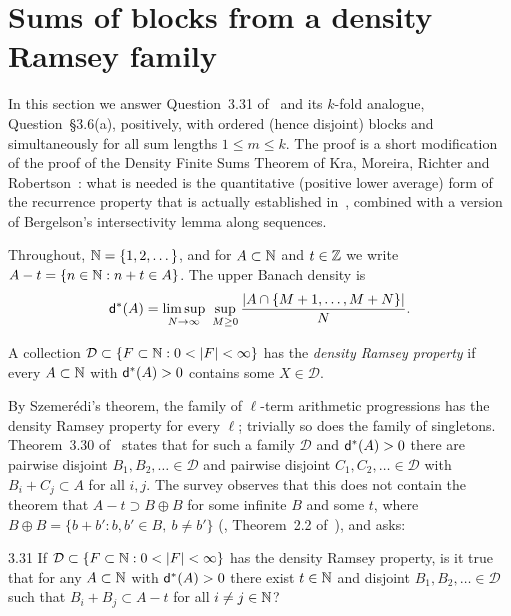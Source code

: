 
\section{Sums of blocks from a density Ramsey family}
\label{IB:sec:q331}

In this section we answer Question~3.31 of~\cite{kra2023problems} and its
$k$-fold analogue, Question~\S3.6(a), positively, with ordered (hence disjoint) blocks and
simultaneously for all sum lengths $1\le m\le k$. The proof is a short modification of the proof of the Density Finite
Sums Theorem of Kra, Moreira, Richter and Robertson~\cite{kra2025density}: what
is needed is the quantitative (positive lower average) form of the recurrence
property that is actually established in~\cite{kra2025density}, combined with a
version of Bergelson's intersectivity lemma along \Fol{} sequences.

Throughout, $\mathbb{N}=\{1,2,\dots\}$, and for $A\subset\mathbb{N}$ and $t\in\mathbb{Z}$ we write
$A-t=\{n\in\mathbb{N}: n+t\in A\}$. The upper Banach density is
\[
\ubd(A)=\limsup_{N\to\infty}\ \sup_{M\ge 0}\frac{|A\cap\{M+1,\dots,M+N\}|}{N}.
\]

\begin{definition}
A collection $\mathcal D\subset\{F\subset\N: 0<|F|<\infty\}$ has the
\emph{density Ramsey property} if every $A\subset\mathbb{N}$ with $\mathsf{d}^*(A)>0$ contains
some $X\in\mathcal D$.
\end{definition}

By Szemer\'edi's theorem, the family of $\ell$-term arithmetic progressions has
the density Ramsey property for every $\ell$; trivially so does the family of
singletons. Theorem~3.30 of~\cite{kra2023problems} states that for such a family
$\mathcal D$ and $\mathsf{d}^*(A)>0$ there are pairwise disjoint $B_1,B_2,\ldots\in\mathcal D$
and pairwise disjoint $C_1,C_2,\ldots\in\mathcal D$ with $B_i+C_j\subset A$ for all
$i,j$. The survey observes that this does not contain the theorem that $A-t\supset B\oplus B$
for some infinite $B$ and some $t$, where $B\oplus B=\{b+b':b,b'\in B,\ b\ne b'\}$
(\cite[Theorem~1.2]{kra2022proof}, Theorem~2.2 of~\cite{kra2023problems}), and asks:

\begin{question}{3.31}
\label{IB:q:331}
If $\mathcal D\subset\{F\subset\N: 0<|F|<\infty\}$ has the density Ramsey property,
is it true that for any $A\subset\mathbb{N}$ with $\mathsf{d}^*(A)>0$ there exist $t\in\mathbb{N}$ and
disjoint $B_1,B_2,\ldots\in\mathcal D$ such that $B_i+B_j\subset A-t$ for all
$i\neq j\in\mathbb{N}$?
\end{question}

